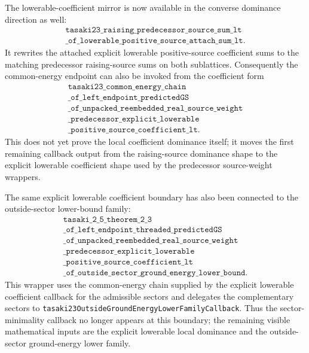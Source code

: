\documentclass[a4paper,11pt]{article}
\begin{document}
The lowerable-coefficient mirror is now available in the converse
dominance direction as well:
\[
\begin{gathered}
\texttt{tasaki23\_raising\_predecessor\_source\_sum\_lt}\\
\texttt{\_of\_lowerable\_positive\_source\_attach\_sum\_lt}.
\end{gathered}
\]
It rewrites the attached explicit lowerable positive-source coefficient
sums to the matching predecessor raising-source sums on both sublattices.
Consequently the common-energy endpoint can also be invoked from the
coefficient form
\[
\begin{gathered}
\texttt{tasaki23\_common\_energy\_chain}\\
\texttt{\_of\_left\_endpoint\_predictedGS}\\
\texttt{\_of\_unpacked\_reembedded\_real\_source\_weight}\\
\texttt{\_predecessor\_explicit\_lowerable}\\
\texttt{\_positive\_source\_coefficient\_lt}.
\end{gathered}
\]
This does not yet prove the local coefficient dominance itself; it moves
the first remaining callback output from the raising-source dominance
shape to the explicit lowerable coefficient shape used by the predecessor
source-weight wrappers.

The same explicit lowerable coefficient boundary has also been connected
to the outside-sector lower-bound family:
\[
\begin{gathered}
\texttt{tasaki\_2\_5\_theorem\_2\_3}\\
\texttt{\_of\_left\_endpoint\_threaded\_predictedGS}\\
\texttt{\_of\_unpacked\_reembedded\_real\_source\_weight}\\
\texttt{\_predecessor\_explicit\_lowerable}\\
\texttt{\_positive\_source\_coefficient\_lt}\\
\texttt{\_of\_outside\_sector\_ground\_energy\_lower\_bound}.
\end{gathered}
\]
This wrapper uses the common-energy chain supplied by the explicit
lowerable coefficient callback for the admissible sectors and delegates
the complementary sectors to
\texttt{tasaki23OutsideGroundEnergyLowerFamilyCallback}.  Thus the
sector-minimality callback no longer appears at this boundary; the
remaining visible mathematical inputs are the explicit lowerable local
dominance and the outside-sector ground-energy lower family.
\end{document}
